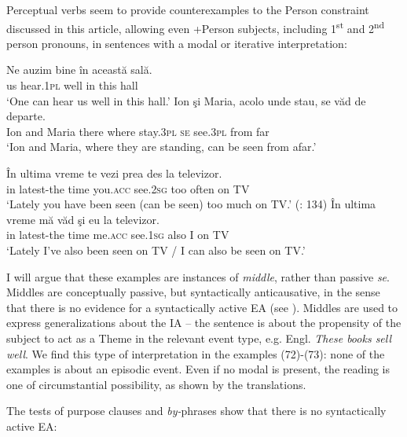 \documentclass[output=paper]{langsci/langscibook}
\begin{document}
Perceptual verbs seem to provide counterexamples to the Person constraint discussed in this article, allowing even +Person subjects, including 1\textsuperscript{st} and 2\textsuperscript{nd} person pronouns, in sentences with a modal or iterative interpretation:

\ea%
    \label{ex:giurgea:72}
    \ea
    \gll Ne auzim    bine în această sală.    \\
         us  hear.\textsc{1pl} well in this      hall\\
    \glt ‘One can hear us well in this hall.’
    \ex
    \gll  Ion şi   Maria,  acolo  unde  stau,      se văd       de     departe.\\
          Ion and Maria  there where stay.\textsc{3pl se} see.\textsc{3pl} from far\\
    \glt ‘Ion and Maria, where they are standing, can be seen from afar.’
    \z
\z

\ea%
    \label{ex:giurgea:73}
    \ea
    \gll În ultima     vreme te            vezi       prea des     la   televizor. \\
         in latest-the time   you.\textsc{acc}  see.\textsc{2sg} too    often on TV\\
    \glt ‘Lately you have been seen (can be seen) too much on TV.’ (\citealt{Dobrovie-Sorin2017}: 134)
    \gll În ultima     vreme  mă        văd       şi     eu  la   televizor.\\
         in latest-the time     me.\textsc{acc} see.\textsc{1sg} also I    on TV\\
    \glt ‘Lately I’ve also been seen on TV / I can also be seen on TV.’
    \z
\z

I will argue that these examples are instances of \textit{middle}, rather than passive \textit{se}. Middles are conceptually passive, but syntactically anticausative, in the sense that there is no evidence for a syntactically active EA (see \citealt{Schäfer2008}). Middles are used to express generalizations about the IA – the sentence is about the propensity of the subject to act as a Theme in the relevant event type, e.g. Engl. \textit{These books sell well}. We find this type of interpretation in the examples (72)-(73): none of the examples is about an episodic event. Even if no modal is present, the reading is one of circumstantial possibility, as shown by the translations. 

The tests of purpose clauses and \textit{by-}phrases show that there is no syntactically active EA: 

\z
\end{document}
